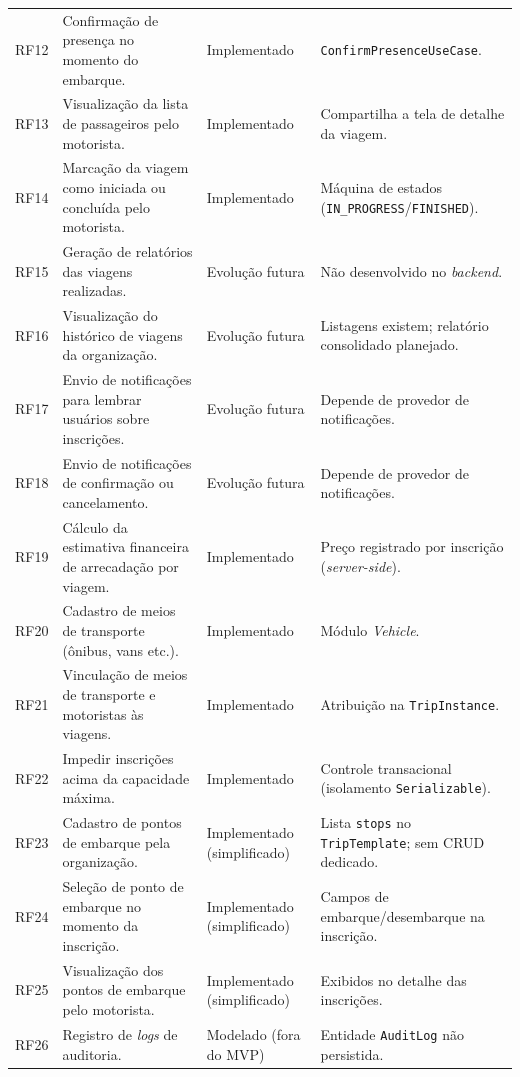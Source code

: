 {\begin{longtable}{@{}l p{5.9cm} p{2.7cm} p{3.7cm}@{}}
RF12 & Confirmação de presença no momento do embarque. & Implementado & \texttt{ConfirmPresenceUseCase}. \\
RF13 & Visualização da lista de passageiros pelo motorista. & Implementado & Compartilha a tela de detalhe da viagem. \\
RF14 & Marcação da viagem como iniciada ou concluída pelo motorista. & Implementado & Máquina de estados (\texttt{IN\_PROGRESS}/\texttt{FINISHED}). \\
RF15 & Geração de relatórios das viagens realizadas. & Evolução futura & Não desenvolvido no \textit{backend}. \\
RF16 & Visualização do histórico de viagens da organização. & Evolução futura & Listagens existem; relatório consolidado planejado. \\
RF17 & Envio de notificações para lembrar usuários sobre inscrições. & Evolução futura & Depende de provedor de notificações. \\
RF18 & Envio de notificações de confirmação ou cancelamento. & Evolução futura & Depende de provedor de notificações. \\
RF19 & Cálculo da estimativa financeira de arrecadação por viagem. & Implementado & Preço registrado por inscrição (\textit{server-side}). \\
RF20 & Cadastro de meios de transporte (ônibus, vans etc.). & Implementado & Módulo \textit{Vehicle}. \\
RF21 & Vinculação de meios de transporte e motoristas às viagens. & Implementado & Atribuição na \texttt{TripInstance}. \\
RF22 & Impedir inscrições acima da capacidade máxima. & Implementado & Controle transacional (isolamento \texttt{Serializable}). \\
RF23 & Cadastro de pontos de embarque pela organização. & Implementado (simplificado) & Lista \texttt{stops} no \texttt{TripTemplate}; sem CRUD dedicado. \\
RF24 & Seleção de ponto de embarque no momento da inscrição. & Implementado (simplificado) & Campos de embarque/desembarque na inscrição. \\
RF25 & Visualização dos pontos de embarque pelo motorista. & Implementado (simplificado) & Exibidos no detalhe das inscrições. \\
RF26 & Registro de \textit{logs} de auditoria. & Modelado (fora do MVP) & Entidade \texttt{AuditLog} não persistida. \\
\end{longtable}
}
